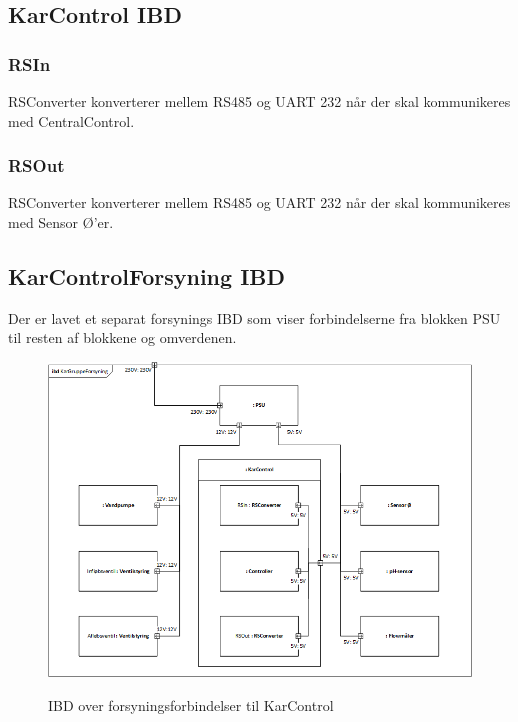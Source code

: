 \subsection{KarControl IBD}

\subsubsection{RSIn}
RSConverter konverterer mellem RS485 og UART 232 når der skal kommunikeres med CentralControl.

\subsubsection{RSOut}
RSConverter konverterer mellem RS485 og UART 232 når der skal kommunikeres med Sensor Ø'er.

\subsection{KarControlForsyning IBD}
Der er lavet et separat forsynings IBD som viser forbindelserne fra blokken PSU til resten af blokkene og omverdenen.
\begin{figure}[H]
	\centering
	\includegraphics[scale=0.7]{Systemarkitektur/KarControl/KarControlForsyning_IBD.png}
	\label{fig:KarControlForsyning}
	\caption{IBD over forsyningsforbindelser til KarControl}
\end{figure}


